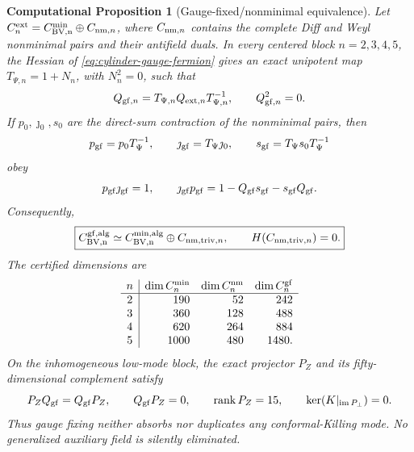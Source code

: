 \documentclass[11pt]{article}
\newtheorem{cproposition}[theorem]{Computational Proposition}
\theoremstyle{definition}
\theoremstyle{remark}
\newcommand{\rank}{\operatorname{rank}}
\begin{document}
\begin{cproposition}[Gauge-fixed/nonminimal equivalence]
\label{prop:gauge-fixed-equivalence}
Let $C^{\rm ext}_n=C^{\rm min}_{\rm BV,n}\oplus C_{{\rm nm},n}$, where
$C_{{\rm nm},n}$ contains the complete Diff and Weyl nonminimal pairs and
their antifield duals.  In every centered block $n=2,3,4,5$, the Hessian of
\eqref{eq:cylinder-gauge-fermion} gives an exact unipotent map
$T_{\Psi,n}=1+N_n$, with $N_n^2=0$, such that
\begin{equation}
 Q_{{\rm gf},n}=T_{\Psi,n}Q_{{\rm ext},n}T_{\Psi,n}^{-1},
 \qquad Q_{{\rm gf},n}^2=0.
\end{equation}
If $p_0,\jmath_0,s_0$ are the direct-sum contraction of the nonminimal
pairs, then
\begin{equation}
 p_{\rm gf}=p_0T_\Psi^{-1},\qquad
 \jmath_{\rm gf}=T_\Psi\jmath_0,\qquad
 s_{\rm gf}=T_\Psi s_0T_\Psi^{-1}
\end{equation}
obey
\begin{equation}\label{eq:gauge-fixed-contraction}
 p_{\rm gf}\jmath_{\rm gf}=1,
 \qquad
 \jmath_{\rm gf}p_{\rm gf}
 =1-Q_{\rm gf}s_{\rm gf}-s_{\rm gf}Q_{\rm gf}.
\end{equation}
Consequently,
\begin{equation}\label{eq:gauge-fixed-equivalence}
 \boxed{
 C^{\rm gf,alg}_{\rm BV,n}
 \simeq C^{\rm min,alg}_{\rm BV,n}\oplus C_{{\rm nm,triv},n},
 \qquad H(C_{{\rm nm,triv},n})=0.}
\end{equation}
The certified dimensions are
\begin{equation}
\begin{array}{c|rrr}
n&\dim C^{\rm min}_n&\dim C^{\rm nm}_n&\dim C^{\rm gf}_n\\ \hline
2&190&52&242\\
3&360&128&488\\
4&620&264&884\\
5&1000&480&1480.
\end{array}
\end{equation}
On the inhomogeneous low-mode block, the exact projector $P_Z$ and its
fifty-dimensional complement satisfy
\begin{equation}\label{eq:gauge-fixed-zero-modes}
 P_ZQ_{\rm gf}=Q_{\rm gf}P_Z,
 \qquad Q_{\rm gf}P_Z=0,
 \qquad \rank P_Z=15,
 \qquad \ker(K|_{\operatorname{im}P_\perp})=0.
\end{equation}
Thus gauge fixing neither absorbs nor duplicates any conformal-Killing
mode.  No generalized auxiliary field is silently eliminated.
\end{cproposition}
\end{document}
